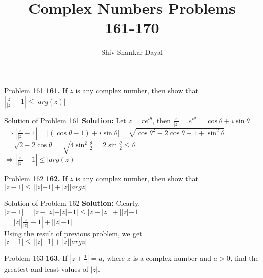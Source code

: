 \documentclass[aspectratio=169,8pt]{beamer}
\title{Complex Numbers Problems\\ 161-170}
\author[Shiv Shankar Dayal]{Shiv Shankar Dayal}
\begin{document}
\begin{frame}
  \titlepage
\end{frame}
\begin{frame}{Problem 161}
  \textbf{161.} If $z$ is any complex number, then show that $\left|\frac{z}{|z|} - 1\right| \leq |arg(z)|$
\end{frame}
\begin{frame}{Solution of Problem 161}
  \textbf{Solution:} Let $z = re^{i\theta}$, then $\frac{z}{|z|} = e^{i\theta} = \cos\theta + i\sin\theta$\\
  \vspace*{0.2cm}
  $\Rightarrow \left|\frac{z}{|z|} - 1\right| = |(\cos\theta - 1) + i\sin\theta| = \sqrt{\cos\theta^2 - 2\cos\theta + 1 +
    \sin^2\theta}$\\
  \vspace*{0.2cm}
  $= \sqrt{2 - 2\cos\theta} = \sqrt{4\sin^2\frac{\theta}{2}} = 2\sin\frac{\theta}{2}\leq \theta$\\
  \vspace*{0.2cm}
  $\Rightarrow \left|\frac{z}{|z|} - 1\right| \leq |arg(z)|$
\end{frame}
\begin{frame}{Problem 162}
  \textbf{162.} If $z$ is any complex number, then show that $|z−1| \leq ||z|−1|+|z||argz|$
\end{frame}
\begin{frame}{Solution of Problem 162}
  \textbf{Solution:} Clearly, $|z - 1| = |z - |z| + |z| - 1|\leq |z - |z|| + ||z| - 1|$\\
  \vspace*{0.2cm}
  $= |z|\left|\frac{z}{|z|} - 1\right| + ||z| - 1|$\\
  \vspace*{0.2cm}
  Using the result of previous problem, we get\\
  \vspace*{0.2cm}
  $|z−1| \leq ||z|−1|+|z||argz|$
\end{frame}
\begin{frame}{Problem 163}
  \textbf{163.} If $\left|z + \frac{1}{z}\right| = a$, where $z$ is a complex number and $a > 0$, find the greatest and least
  values of $|z|$.
\end{frame}
\end{document}
